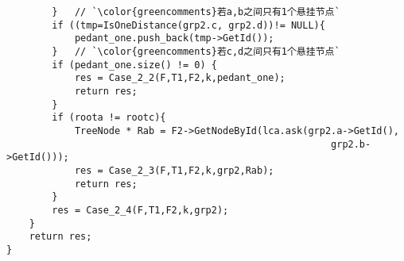 \begin{CJK}{UTF8}{gbsn}
\begin{lstlisting}
        }   // `\color{greencomments}若a,b之间只有1个悬挂节点`
        if ((tmp=IsOneDistance(grp2.c, grp2.d))!= NULL){ 
            pedant_one.push_back(tmp->GetId()); 
        }   // `\color{greencomments}若c,d之间只有1个悬挂节点`
        if (pedant_one.size() != 0) {
            res = Case_2_2(F,T1,F2,k,pedant_one);
            return res;
        }
        if (roota != rootc){
            TreeNode * Rab = F2->GetNodeById(lca.ask(grp2.a->GetId(),
                                                         grp2.b->GetId()));
            res = Case_2_3(F,T1,F2,k,grp2,Rab);
            return res;
        }
        res = Case_2_4(F,T1,F2,k,grp2);
    }
    return res;
}
\end{lstlisting}
\end{CJK}















